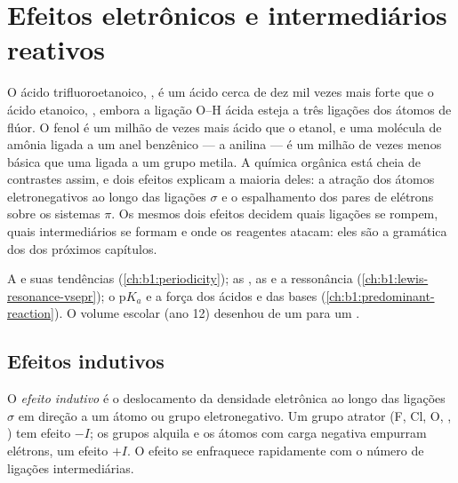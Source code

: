 \chapter{Efeitos eletrônicos e intermediários reativos}\label{ch:b1:electronic-effects}

O ácido trifluoroetanoico, , é um ácido cerca de dez mil
vezes mais forte que o ácido etanoico, , embora a ligação
O--H ácida esteja a três ligações dos átomos de flúor. O fenol é um
milhão de vezes mais ácido que o etanol, e uma molécula de amônia ligada
a um anel benzênico --- a anilina --- é um milhão de vezes menos básica
que uma ligada a um grupo metila. A química orgânica está cheia de
contrastes assim, e dois efeitos explicam a maioria deles: a atração dos
átomos eletronegativos ao longo das ligações $\sigma$ e o espalhamento
dos pares de elétrons sobre os sistemas $\pi$. Os mesmos dois efeitos
decidem quais ligações se rompem, quais intermediários se formam e onde
os reagentes atacam: eles são a gramática dos  dos
próximos capítulos.

\begin{recall}
A  e suas tendências (\cref{ch:b1:periodicity}); as
, as  e a ressonância
(\cref{ch:b1:lewis-resonance-vsepr}); o $\mathrm{p}K_a$ e a força dos
ácidos e das bases (\cref{ch:b1:predominant-reaction}). O volume escolar
(ano 12) desenhou  de um  para um .
\end{recall}

\section{Efeitos indutivos}

\begin{definition}\label{def:b1:electronic-effects:inductive}
O \emph{efeito indutivo} é o deslocamento da
densidade eletrônica ao longo das ligações $\sigma$ em direção a um
átomo ou grupo eletronegativo. Um grupo atrator (F, Cl, O, ,
) tem efeito $-I$; os grupos alquila e os átomos com carga
negativa empurram elétrons, um efeito $+I$. O efeito se enfraquece
rapidamente com o número de ligações intermediárias.
\end{definition}

